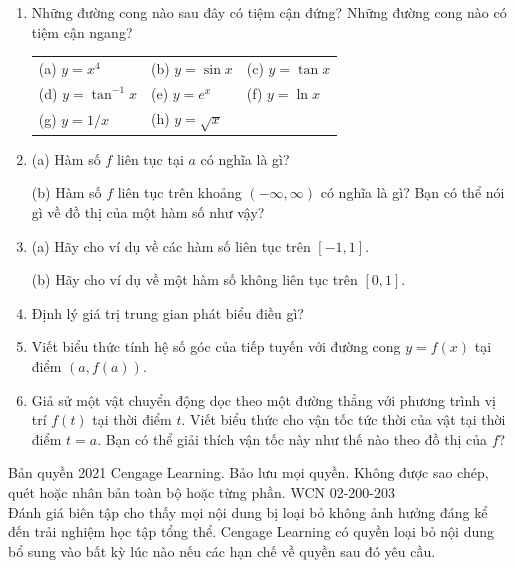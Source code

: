 \documentclass[10pt,letterpaper]{article}
\begin{document}
\begin{minipage}[t]{0.485\textwidth}
\begin{enumerate}[label=\textbf{\arabic*.}, leftmargin=1.5em, start=6, itemsep=6pt, topsep=0pt]
    \item Những đường cong nào sau đây có tiệm cận đứng? Những đường cong nào có tiệm cận ngang?
    \par\vspace{2pt}
    \begingroup
    \setlength{\tabcolsep}{2pt}
    \begin{tabular}{@{}lll@{}}
        (a) $y = x^4$ & (b) $y = \sin x$ & (c) $y = \tan x$ \\[3pt]
        (d) $y = \tan^{-1} x$ \hspace{0.5em} & (e) $y = e^x$ \hspace{1em} & (f) $y = \ln x$ \\[3pt]
        (g) $y = 1/x$ & (h) $y = \sqrt{x}$ &
    \end{tabular}
    \endgroup

    \item (a) Hàm số $f$ liên tục tại $a$ có nghĩa là gì?
    \par\vspace{2pt}
    (b) Hàm số $f$ liên tục trên khoảng $(-\infty, \infty)$ có nghĩa là gì? Bạn có thể nói gì về đồ thị của một hàm số như vậy?

    \item (a) Hãy cho ví dụ về các hàm số liên tục trên $[-1, 1]$.
    \par\vspace{2pt}
    (b) Hãy cho ví dụ về một hàm số không liên tục trên $[0, 1]$.

    \item Định lý giá trị trung gian phát biểu điều gì?

    \item Viết biểu thức tính hệ số góc của tiếp tuyến với đường cong $y = f(x)$ tại điểm $(a, f(a))$.

    \item Giả sử một vật chuyển động dọc theo một đường thẳng với phương trình vị trí $f(t)$ tại thời điểm $t$. Viết biểu thức cho vận tốc tức thời của vật tại thời điểm $t = a$. Bạn có thể giải thích vận tốc này như thế nào theo đồ thị của $f$?
\end{enumerate}
\end{minipage}

\vfill
\begin{center}
{\fontsize{6.5}{8}\selectfont\color{gray!80!black}
Bản quyền 2021 Cengage Learning. Bảo lưu mọi quyền. Không được sao chép, quét hoặc nhân bản toàn bộ hoặc từng phần. WCN 02-200-203\\[1pt]
Đánh giá biên tập cho thấy mọi nội dung bị loại bỏ không ảnh hưởng đáng kể đến trải nghiệm học tập tổng thể. Cengage Learning có quyền loại bỏ nội dung bổ sung vào bất kỳ lúc nào nếu các hạn chế về quyền sau đó yêu cầu.
}
\end{center}
\end{document}
